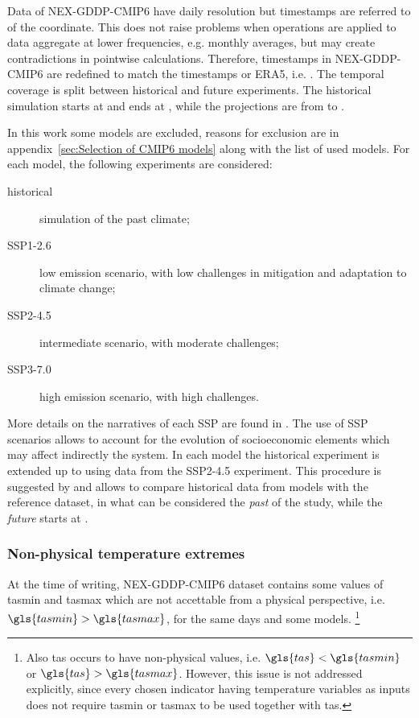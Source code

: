 Data of NEX-GDDP-CMIP6 have daily resolution but timestamps are referred to  of the coordinate. This does not raise problems when operations are applied to data aggregate at lower frequencies, e.g. monthly averages, but may create contradictions in pointwise calculations. Therefore, timestamps in NEX-GDDP-CMIP6 are redefined to match the timestamps or ERA5, i.e. .
The temporal coverage is split between historical and future experiments. The historical simulation starts at  and ends at , while the projections are from  to .

In this work some models are excluded, reasons for exclusion are in appendix~\ref{sec:Selection of CMIP6 models} along with the list of used models. For each model, the following experiments are considered:
\begin{description}
  \item[historical] simulation of the past climate;
  \item[SSP1-2.6] low emission scenario, with low challenges in mitigation and adaptation to climate change;
  \item[SSP2-4.5] intermediate scenario, with moderate challenges;
  \item[SSP3-7.0] high emission scenario, with high challenges.
\end{description}
More details on the narratives of each \gls{SSP} are found in \cite{2017ONeillTheRoads}. The use of SSP scenarios allows to account for the evolution of socioeconomic elements which may affect indirectly the system.
In each model the historical experiment is extended up to  using data from the SSP2-4.5 experiment. This procedure is suggested by \cite[1954]{2016EyringOverviewOf} and allows to compare historical data from models with the reference dataset, in what can be considered the \emph{past} of the study, while the \emph{future} starts at .



\subsubsection{Non-physical temperature extremes}
At the time of writing, NEX-GDDP-CMIP6 dataset contains some values of \glsdesc{tasmin} and \glsdesc{tasmax} which are not accettable from a physical perspective, i.e. $\gls{tasmin} > \gls{tasmax}$, for the same days and some models.%
\footnote{Also \glsdesc{tas} occurs to have non-physical values, i.e. $\gls{tas} < \gls{tasmin}$ or $\gls{tas} > \gls{tasmax}$. However, this issue is not addressed explicitly, since every chosen indicator having temperature variables as inputs does not require \gls{tasmin} or \gls{tasmax} to be used together with \gls{tas}.}

